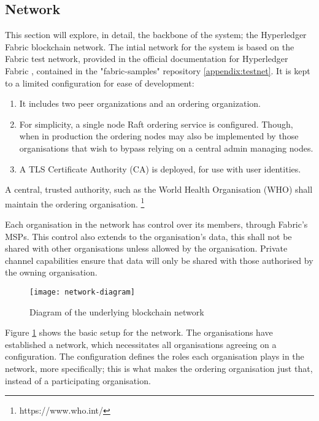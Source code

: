 \subsection{Network}
This section will explore, in detail, the backbone of the system; the Hyperledger Fabric blockchain network. 
The intial network for the system is based on the Fabric test network, provided in the official documentation for Hyperledger Fabric \cite{noauthor_using_nodate}, contained in the "fabric-samples" repository \ref{appendix:testnet}.
It is kept to a limited configuration for ease of development:
\begin{enumerate}
\item{It includes two peer organizations and an ordering organization.}
\item{For simplicity, a single node Raft ordering service is configured. Though, when in production the ordering nodes may also be implemented by those organisations that wish to bypass relying on a central admin managing nodes.}
\item{A TLS Certificate Authority (CA) is deployed, for use with user identities.}
\end{enumerate}

A central, trusted authority, such as the World Health Organisation (WHO) shall maintain the ordering organisation. \footnote{https://www.who.int/}

Each organisation in the network has control over its members, through Fabric's MSPs. 
This control also extends to the organisation's data, this shall not be shared with other organisations unless allowed by the organisation. 
Private channel capabilities ensure that data will only be shared with those authorised by the owning organisation. 

\begin{figure}[H]
  \texttt{[image: network-diagram]}
  \caption{Diagram of the underlying blockchain network}
  \label{fig:network-diagram}
\end{figure}

Figure \ref{fig:network-diagram} shows the basic setup for the network. 
The organisations have established a network, which necessitates all organisations agreeing on a configuration. 
The configuration defines the roles each organisation plays in the network, more specifically; this is what makes the ordering organisation just that, instead of a participating organisation.

